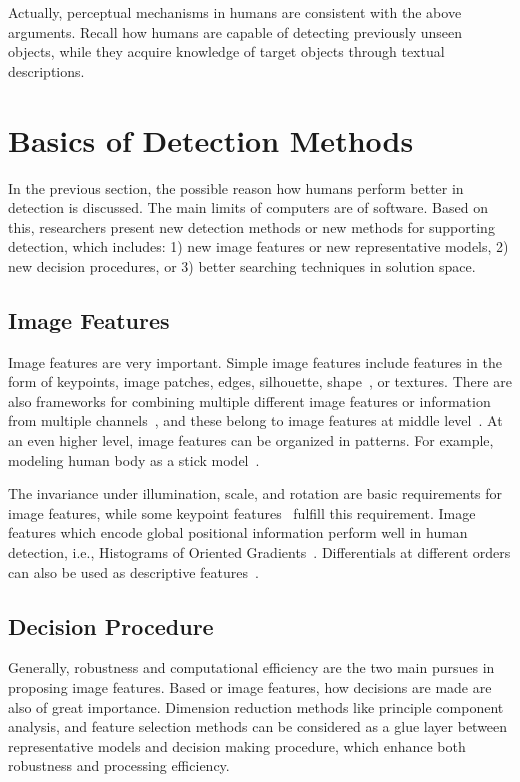Actually, perceptual mechanisms in humans are consistent with the above arguments. Recall how humans are capable of detecting previously unseen objects, while they acquire knowledge of target objects through textual descriptions.

\section{Basics of Detection Methods}

In the previous section, the possible reason how humans perform better in detection is discussed. The main limits of computers are of software. Based on this, researchers present new detection methods or new methods for supporting detection, which includes: 1) new image features or new representative models, 2) new decision procedures, or 3) better searching techniques in solution space.
\subsection{Image Features}
Image features are very important. Simple image features include features in the form of keypoints, image patches, edges,  silhouette, shape~\citep{scontext}, or textures. There are also frameworks for combining multiple different image features or information from multiple channels~\citep{regionc,bgf,lbp,lss}, and these belong to image features at middle level~\citep{midf}. At an even higher level, image features can be  organized in patterns. For example, modeling human body as a stick model~\citep{stickb}.

The invariance under illumination, scale, and rotation are basic requirements for image features, while some keypoint features~\citep{ij2,o12,o14,o15,o2} fulfill this requirement. Image features which encode global positional information perform well in human detection, i.e., Histograms of Oriented
Gradients~\citep{ij4}. Differentials at different orders can also be used as descriptive features~\citep{regionc}.



\subsection{Decision Procedure}
Generally, robustness and computational efficiency are the two main pursues in proposing image features. Based or image features, how decisions are made are also of great importance. Dimension reduction methods like principle component analysis, and feature selection methods can be considered as a glue layer between representative models and decision making procedure, which enhance both robustness and processing efficiency.

